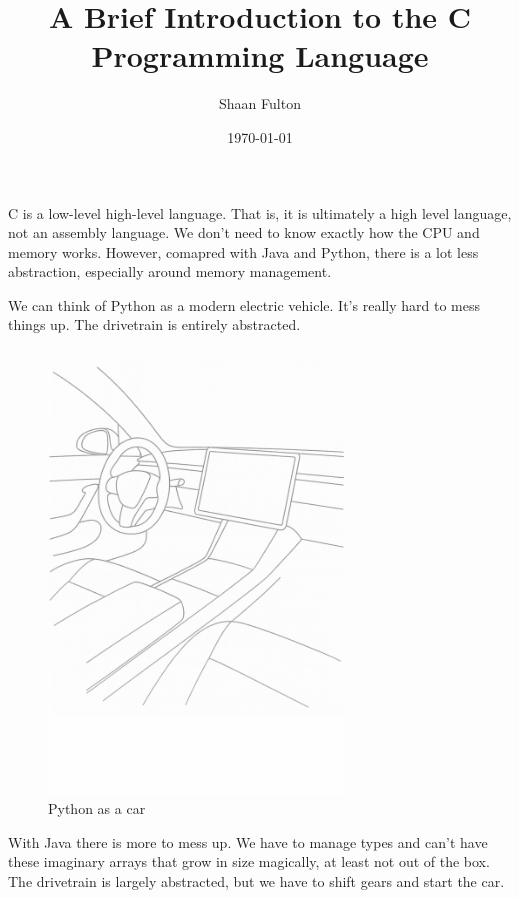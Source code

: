 \documentclass[12pt]{article}
\title{A Brief Introduction to the C Programming Language}
\author{Shaan Fulton}
\date{\today}
\begin{document}
\maketitle

C is a low-level high-level language. That is, it is ultimately a high level language, not an assembly language. We don't need to know exactly how the CPU and memory works. However, comapred with Java and Python, there is a lot less abstraction, especially around memory management.

We can think of Python as a modern electric vehicle. It's really hard to mess things up. The drivetrain is entirely abstracted.

\begin{figure}[htbp]
    \centering
    \includegraphics[width=0.7\textwidth]{python.png}
    \caption{Python as a car}
    \label{fig:python}
\end{figure}

With Java there is more to mess up. We have to manage types and can't have these imaginary arrays that grow in size magically, at least not out of the box. The drivetrain is largely abstracted, but we have to shift gears and start the car.
\end{document}
